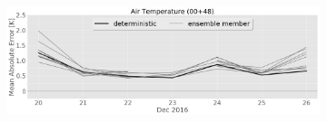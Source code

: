 \begin{figure}[h]
\begin{subfigure}[b]{0.49\textwidth}
			\caption{}\label{fig:bias:temp}
		\end{subfigure}
        \begin{subfigure}[b]{0.49\textwidth}
			\includegraphics[width=\textwidth]{./fig_sfc_temp/MAE_20161220_26_00}
			\caption{}\label{fig:MAE:temp}
		\end{subfigure}
\end{figure}
